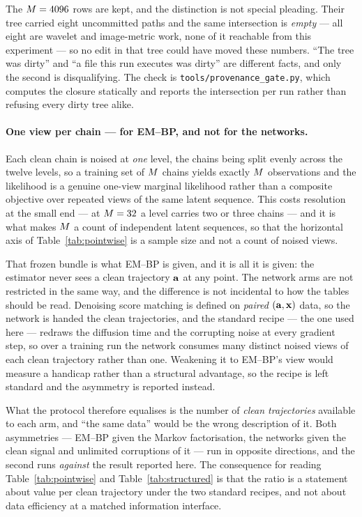 The $M=4096$ rows are kept, and the distinction is not special pleading. Their tree carried
eight uncommitted paths and the same intersection is \emph{empty} --- all eight are wavelet and
image-metric work, none of it reachable from this experiment --- so no edit in that tree could have
moved these numbers. ``The tree was dirty'' and ``a file this run executes was dirty'' are
different facts, and only the second is disqualifying. The check is
\texttt{tools/provenance\_gate.py}, which computes the closure statically and reports the
intersection per run rather than refusing every dirty tree alike.

\paragraph{One view per chain --- for EM--BP, and not for the networks.} Each clean chain is
noised at \emph{one} level, the chains being
split evenly across the twelve levels, so a training set of $M$ chains yields exactly $M$
observations and the likelihood is a genuine one-view marginal likelihood rather than a composite
objective over repeated views of the same latent sequence. This costs resolution at the small end
--- at $M=32$ a level carries two or three chains --- and it is what makes $M$ a count of
independent latent sequences, so that the horizontal axis of Table~\ref{tab:pointwise} is a
sample size and not a count of noised views.

That frozen bundle is what EM--BP is given, and it is all it is given: the estimator never sees a
clean trajectory $\mathbf{a}$ at any point. The network arms are not restricted in the same way, and the
difference is not incidental to how the tables should be read. Denoising score matching is
defined on \emph{paired} $(\mathbf{a},\mathbf{x})$ data, so the network is handed the clean trajectories, and
the standard recipe --- the one used here --- redraws the diffusion time and the corrupting noise
at every gradient step, so over a training run the network consumes many distinct noised views of
each clean trajectory rather than one. Weakening it to EM--BP's view would measure a handicap
rather than a structural advantage, so the recipe is left standard and the asymmetry is reported
instead.

What the protocol therefore equalises is the number of \emph{clean trajectories} available to
each arm, and ``the same data'' would be the wrong description of it. Both asymmetries ---
EM--BP given the Markov factorisation, the networks given the clean signal and unlimited
corruptions of it --- run in opposite directions, and the second runs \emph{against} the result
reported here. The consequence for reading Table~\ref{tab:pointwise} and
Table~\ref{tab:structured} is that the ratio is a statement about value per clean trajectory
under the two standard recipes, and not about data efficiency at a matched information interface.

